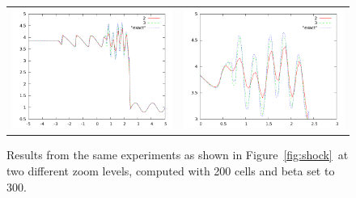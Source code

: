 \documentclass[10pt]{article}
\begin{document}
\begin{figure}
  \begin{center}
	\begin{tabular}{cc}
      \includegraphics[width=.475\textwidth]{300.png} &
	  \includegraphics[width=.475\textwidth]{300zoom.png}
	\end{tabular}
  \end{center}
  \caption{Results from the same experiments as shown in Figure~\ref{fig:shock}~at two different zoom levels, computed with 200 cells and beta set to 300.}
\end{figure}



\end{document}
